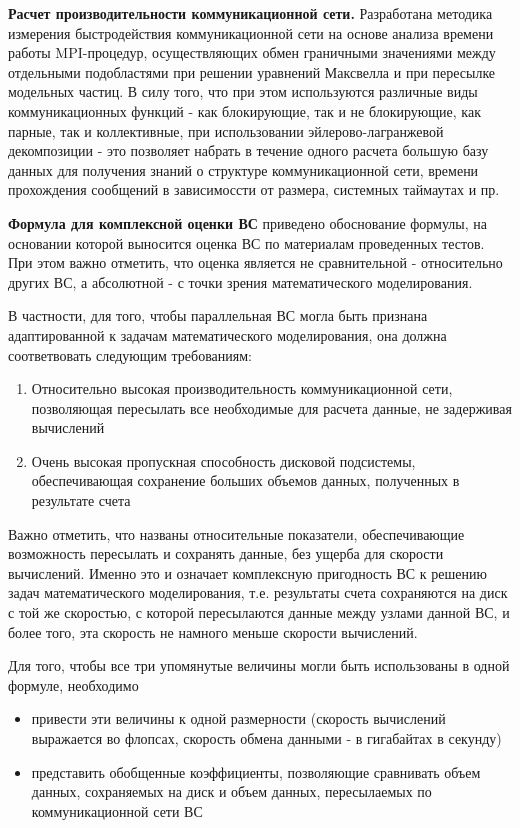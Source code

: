\clearpage

\textbf{Расчет производительности коммуникационной сети.}
Разработана методика измерения быстродействия коммуникационной сети на основе анализа времени работы MPI-процедур, осуществляющих обмен граничными значениями между отдельными подобластями при решении уравнений Максвелла и при пересылке модельных частиц. В силу того, что при этом используются различные виды коммуникационных функций  - как блокирующие, так и не блокирующие, как парные, так и коллективные, при использовании эйлерово-лагранжевой декомпозиции - это позволяет набрать в течение одного расчета большую базу данных для получения знаний о структуре коммуникационной сети, времени прохождения сообщений в зависимоссти от размера, системных таймаутах и пр. 

\textbf{Формула для комплексной оценки ВС}
приведено обоснование формулы, на основании которой выносится оценка ВС по материалам проведенных тестов. При этом важно отметить, что оценка является не сравнительной - относительно других ВС, а абсолютной - с точки зрения математического моделирования. 

В частности, для того, чтобы параллельная ВС могла быть признана адаптированной к задачам математического моделирования, она должна соответвовать следующим требованиям:
\begin{enumerate}
	\item Относительно высокая производительность коммуникационной сети, позволяющая пересылать все необходимые для расчета данные, не задерживая вычислений
	\item Очень высокая пропускная способность дисковой подсистемы, обеспечивающая сохранение больших объемов данных, полученных в результате счета  	
\end{enumerate}

Важно отметить, что названы относительные показатели, обеспечивающие возможность пересылать и сохранять данные, без ущерба для скорости вычислений. Именно это и означает  комплексную пригодность ВС к решению задач математического моделирования, т.е. результаты счета сохраняются на диск с той же скоростью, с которой пересылаются данные между узлами данной ВС, и более того, эта скорость не намного меньше скорости вычислений.

Для того, чтобы все три упомянутые величины могли быть использованы в одной формуле, необходимо 
\begin{itemize}
	\item привести эти величины к одной размерности (скорость вычислений выражается во флопсах, скорость обмена данными - в гигабайтах в секунду)
	\item представить обобщенные коэффициенты, позволяющие сравнивать объем данных, сохраняемых на диск и объем данных, пересылаемых по коммуникационной сети ВС  
\end{itemize}


